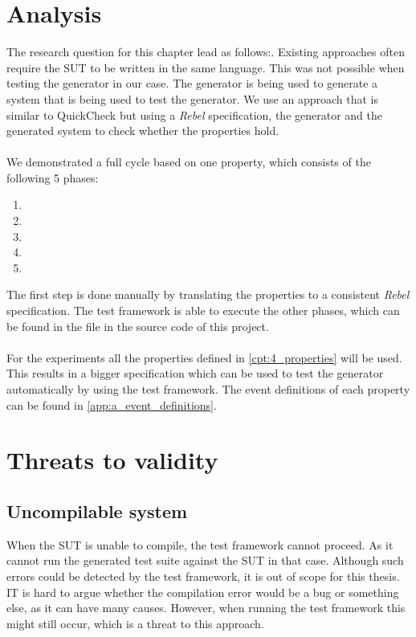 \section{Analysis}
The research question for this chapter lead as follows:\rqTwo{}. Existing approaches often require the SUT to be written in the same language. This was not possible when testing the generator in our case. The generator is being used to generate a system that is being used to test the generator. We use an approach that is similar to QuickCheck but using a \textit{Rebel} specification, the generator and the generated system to check whether the properties hold.\\
\\
We demonstrated a full cycle based on one property, which consists of the following 5 phases:
\begin{enumerate}
\item \tfPhaseOne{}
\item \tfPhaseTwo{}
\item \tfPhaseThree{}
\item \tfPhaseFour{}
\item \tfPhaseFive{}
\end{enumerate}
The first step is done manually by translating the properties to a consistent \textit{Rebel} specification. The test framework is able to execute the other phases, which can be found in the  file in the source code of this project.\\
\\
For the experiments all the properties defined in \autoref{cpt:4_properties} will be used. This results in a bigger specification which can be used to test the generator automatically by using the test framework. The event definitions of each property can be found in \autoref{app:a_event_definitions}.

\section{Threats to validity}

\subsection*{Uncompilable system}
When the SUT is unable to compile, the test framework cannot proceed. As it cannot run the generated test suite against the SUT in that case. Although such errors could be detected by the test framework, it is out of scope for this thesis. IT is hard to argue whether the compilation error would be a bug or something else, as it can have many causes. However, when running the test framework this might still occur, which is a threat to this approach.

